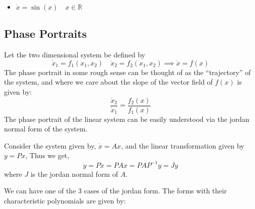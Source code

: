 \begin{example}
\begin{itemize}
\begin{center}
        \end{center}
        \item \(\dot{x} = \sin (x) \quad x \in \mathbb{R}\)
        \begin{center}
        \end{center}
    \end{itemize}
    
\end{example}

\subsection{Phase Portraits}
Let the two dimensional system be defined by
\[
    \dot{x}_1 = f_1(x_1, x_2) \quad \dot{x}_2 = f_2(x_1, x_2) \implies \dot{x} = f(x)  
\]
The phase portrait in some rough sense can be thought of as the ``trajectory'' of the system,
and where we care about the slope of the vector field of \(f(x)\) is given by:
\[
    \frac{\dot{x}_2}{\dot{x}_1} = \frac{f_2(x)}{f_1(x)}  
\] 
The phase portrait of the linear system can be easily understood via the jordan normal form
of the system.

Consider the system given by, \(\dot{x} = Ax \), and the linear transformation given by \(y = Px\),
Thus we get,
\[
    \dot{y} = P\dot{x} = PAx = PAP^{-1}y = Jy  
\]  
where \(J\) is the jordan normal form of \(A\).

We can have one of the 3 cases of the jordan form. The forms with their characteristic
polynomials are given by:

